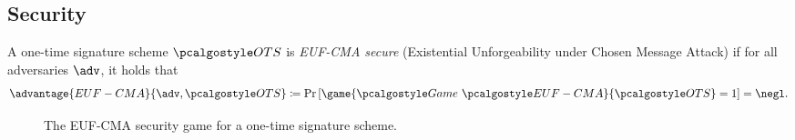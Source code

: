 \subsection{Security}

\begin{definition}\label{def:euf-cma-ot}
    A one-time signature scheme $\algo{OTS}$ is \emph{EUF-CMA secure} (Existential Unforgeability under Chosen Message Attack) if for all \ppt adversaries $\adv$, it holds that
    \[
    \advantage{EUF-CMA}{\adv, \algo{OTS}} \defeq \pr{\game{\Game~\algo{EUF-CMA}}{\algo{OTS}} = 1} = \negl.
    \]
\end{definition}

\begin{figure}[tbh]
 \begin{tcolorbox}%
  \begin{pchstack}[center]
   \pchspace
  \end{pchstack}
 \end{tcolorbox}
 \caption{The EUF-CMA security game for a one-time signature scheme.}
 \label{fig:euf-cma-ots}
\end{figure}

